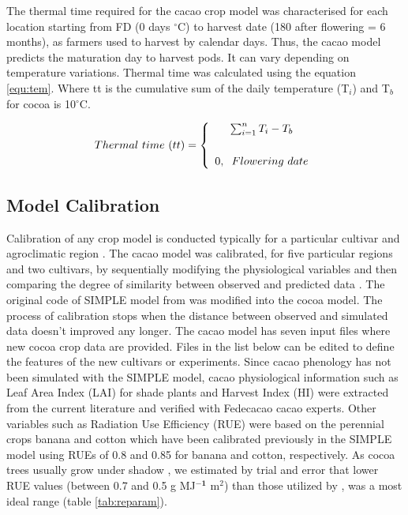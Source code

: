 \documentclass[gene,journal,article,submit,moreauthors,pdftex]{Definitions/mdpi}
\begin{document}
The thermal time required for the cacao crop model was characterised for each location starting from FD (0 days $^\circ$C) to harvest date (180 after flowering = 6 months), as farmers used to harvest by calendar days. Thus, the cacao model predicts the maturation day to harvest pods. It can vary depending on temperature variations.  Thermal time was calculated using the equation \ref{equ:tem}. Where tt is the cumulative sum of the daily temperature (T$_{i}$) and T$_{b}$ for cocoa is 10$^\circ$C.

\begin{equation}
Thermal~time~(tt) = \left\lbrace\begin{array}{c} \sum_{i=1}^{n} T_{i} - T_{b} \\
\vspace{0.2cm}\\ 
0,\hspace{0.2cm} Flowering~date\end{array}\right.
\label{equ:tem}
\end{equation}


\subsection{Model Calibration}

Calibration of any crop model is conducted typically for a particular cultivar and agroclimatic region \citep{Crout20142}. The cacao model was calibrated, for five particular regions and two cultivars, by sequentially modifying the physiological variables and then comparing the degree of similarity between observed and predicted data \citep{Crout2008chapter, Zao2019simple,Camargo2019aquacropr, Bai2020}. The original code of SIMPLE model from \citep{Zao2019simple} was modified into the cocoa model. The process of calibration stops when the distance between observed and simulated data doesn't improved any longer. The cacao model has seven input files where new cocoa crop data are provided. Files in the list below can be edited to define the features of the new cultivars or experiments. Since cacao phenology has not been simulated with the SIMPLE model, cacao physiological information such as Leaf Area Index (LAI) for shade plants \citep{Agele2016, Soltani2012, zuidema2005,Baracaldo2014} and Harvest Index (HI) \citep{Quintana2015} were extracted from the current literature and verified with Fedecacao cacao experts. Other variables such as Radiation Use Efficiency (RUE) \citep{Fletcher2013RUE,Bonhomme2000} were based on the perennial crops banana and cotton which have been calibrated previously in the SIMPLE model \citep{Zao2019simple} using RUEs of 0.8 and 0.85 for banana and cotton, respectively. As cocoa trees usually grow under shadow \citep{lahive2019}, we estimated by trial and error that lower RUE values (between 0.7 and 0.5 g MJ$^{\mathbf{-1}}$ m$^{2}$) than those utilized by \cite{Zao2019simple}, was a most ideal range  (table \ref{tab:reparam}). 
\end{document}
